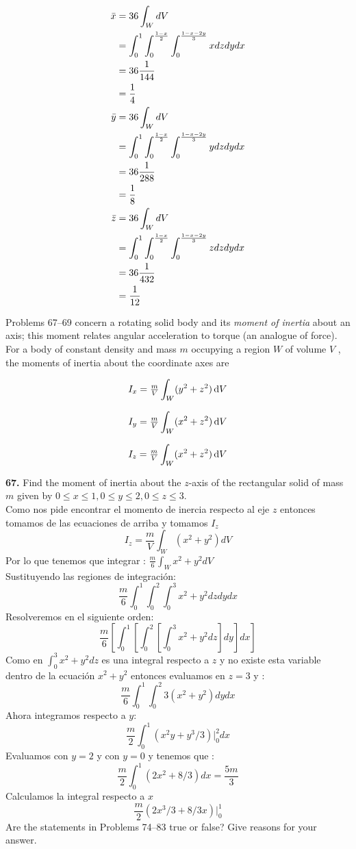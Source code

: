\documentclass[11pt]{report}
\begin{document}
\begin{equation}
	\begin{split}
		\bar{x}&=36\int_WdV\\
			   &=\int_0^1\int_0^{\frac{1-x}{2}}\int_0^{\frac{1-x-2y}{3}}xdzdydx\\
			   &=36\frac{1}{144}\\
			   &=\frac{1}{4}\\
		\bar{y}&=36\int_WdV\\
			   &=\int_0^1\int_0^{\frac{1-x}{2}}\int_0^{\frac{1-x-2y}{3}}ydzdydx\\
			   &=36\frac{1}{288}\\
			   &=\frac{1}{8}\\
		\bar{z}&=36\int_WdV\\
			   &=\int_0^1\int_0^{\frac{1-x}{2}}\int_0^{\frac{1-x-2y}{3}}zdzdydx\\
			   &=36\frac{1}{432}\\
			   &=\frac{1}{12}\\
	\end{split}
\end{equation}


Problems 67–69 concern a rotating solid body and its \textit{moment of inertia}
about an axis; this moment relates angular acceleration to torque (an analogue
of force). For a body of constant density and mass $m$ occupying a region $W$
of volume $V$ , the moments of inertia about the coordinate axes are

\[I_x = \tfrac{m}{V} \int _W (y^2 + z^2) \, \text d V \]

\[I_y = \tfrac{m}{V} \int _W (x^2 + z^2) \, \text d V \]

\[I_z = \tfrac{m}{V} \int _W (x^2 + z^2) \, \text d V \]

\textbf{67.} Find the moment of inertia about the $z$-axis of the rectangular
solid of mass $m$ given by $0 \leq x \leq 1, 0 \leq y \leq 2, 0 \leq z \leq 3$. \\

Como nos  pide encontrar el momento de inercia respecto al eje $z$ entonces tomamos de las ecuaciones de arriba y tomamos $I_z$
\[I_{z} = \frac{m}{V} \int_W (x^2+y^2) dV\]
Por lo que tenemos que integrar : $\frac{m}{6} \int_W x^2+ y^2 dV$\\
Sustituyendo las regiones de integración:
\[\frac{m}{6} \int_0^1 \int_0^2 \int_0^3 x^2 + y^2 dz dy dx\]
Resolveremos en el siguiente orden:
\[\frac{m}{6} \left[ \int_0^1\left[ \int_0^2\left[ \int_0^3 x^2 + y^2 dz \right] dy \right] dx \right] \]
Como en $\int_0 ^3 x^2+ y^2 dz$ es una integral respecto a $z$ y no existe esta variable dentro de la ecuación $x^2+ y^2$ entonces evaluamos en $z = 3$ y :
\[\frac{m}{6} \int_0^1 \int_0^2 3\left( x^2+y^2 \right) dy dx\]
Ahora integramos respecto a $y$:
\[\frac{m}{2} \int_0^1 \left( x^2y+ y^3/3 \right) \vert_0^2 dx\]
Evaluamos con $y= 2$ y con $y= 0$ y tenemos que :
\[\frac{m}{2} \int_0^1 \left( 2x^2+ 8/3 \right) dx = \frac{5m}{3}\]
Calculamos la integral respecto a $x$
\[\frac{m}{2} \left( 2x^3/3 + 8/3 x \right) \vert_0^1\]
Are the statements in Problems 74–83 true or false? Give reasons for your answer. \\
\end{document}
